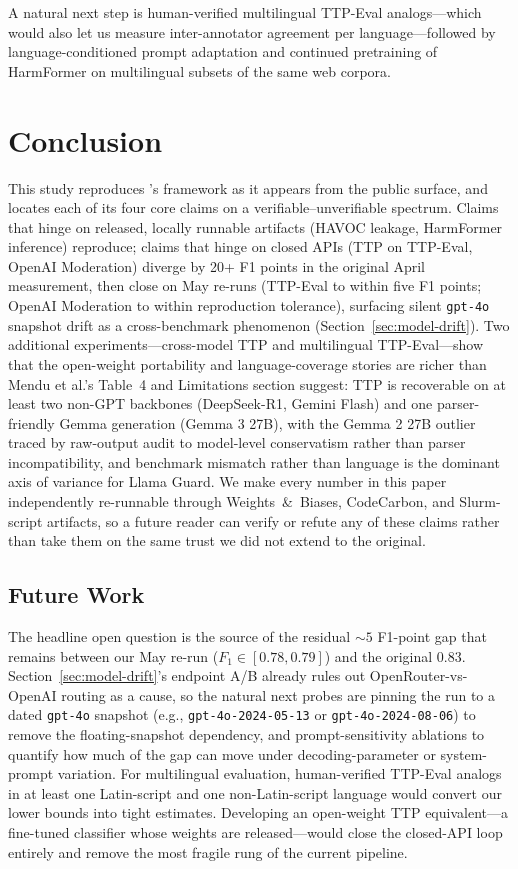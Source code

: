 \documentclass[10pt]{article} %
\begin{document}
A natural next step is human-verified multilingual TTP-Eval analogs---which would also let us measure inter-annotator agreement per language---followed by language-conditioned prompt adaptation and continued pretraining of HarmFormer on multilingual subsets of the same web corpora.

\section{Conclusion}
\label{sec:conclusion}

This study reproduces \citet{mendu2025saferpretraining}'s framework as it appears from the public surface, and locates each of its four core claims on a verifiable--unverifiable spectrum. Claims that hinge on released, locally runnable artifacts (HAVOC leakage, HarmFormer inference) reproduce; claims that hinge on closed APIs (TTP on TTP-Eval, OpenAI Moderation) diverge by 20+ F1 points in the original April measurement, then close on May re-runs (TTP-Eval to within five F1 points; OpenAI Moderation to within reproduction tolerance), surfacing silent \texttt{gpt-4o} snapshot drift as a cross-benchmark phenomenon (Section~\ref{sec:model-drift}). Two additional experiments---cross-model TTP and multilingual TTP-Eval---show that the open-weight portability and language-coverage stories are richer than Mendu et al.'s Table~4 and Limitations section suggest: TTP is recoverable on at least two non-GPT backbones (DeepSeek-R1, Gemini Flash) and one parser-friendly Gemma generation (Gemma 3 27B), with the Gemma 2 27B outlier traced by raw-output audit to model-level conservatism rather than parser incompatibility, and benchmark mismatch rather than language is the dominant axis of variance for Llama Guard. We make every number in this paper independently re-runnable through Weights~\&~Biases, CodeCarbon, and Slurm-script artifacts, so a future reader can verify or refute any of these claims rather than take them on the same trust we did not extend to the original.

\subsection{Future Work}
The headline open question is the source of the residual ${\sim}5$ F1-point gap that remains between our May re-run ($F_1 \in [0.78, 0.79]$) and the original 0.83. Section~\ref{sec:model-drift}'s endpoint A/B already rules out OpenRouter-vs-OpenAI routing as a cause, so the natural next probes are pinning the run to a dated \texttt{gpt-4o} snapshot (e.g., \texttt{gpt-4o-2024-05-13} or \texttt{gpt-4o-2024-08-06}) to remove the floating-snapshot dependency, and prompt-sensitivity ablations to quantify how much of the gap can move under decoding-parameter or system-prompt variation. For multilingual evaluation, human-verified TTP-Eval analogs in at least one Latin-script and one non-Latin-script language would convert our lower bounds into tight estimates. Developing an open-weight TTP equivalent---a fine-tuned classifier whose weights are released---would close the closed-API loop entirely and remove the most fragile rung of the current pipeline.
\end{document}
